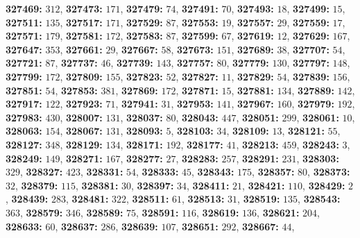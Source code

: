 \textsf{\bfseries 327469:} $312$, \textsf{\bfseries 327473:} $171$, \textsf{\bfseries 327479:} $74$, \textsf{\bfseries 327491:} $70$, \textsf{\bfseries 327493:} $18$, \textsf{\bfseries 327499:} $15$, \textsf{\bfseries 327511:} $135$, \textsf{\bfseries 327517:} $171$, \textsf{\bfseries 327529:} $87$, \textsf{\bfseries 327553:} $19$, \textsf{\bfseries 327557:} $29$, \textsf{\bfseries 327559:} $17$, \textsf{\bfseries 327571:} $179$, \textsf{\bfseries 327581:} $172$, \textsf{\bfseries 327583:} $87$, \textsf{\bfseries 327599:} $67$, \textsf{\bfseries 327619:} $12$, \textsf{\bfseries 327629:} $167$, \textsf{\bfseries 327647:} $353$, \textsf{\bfseries 327661:} $29$, \textsf{\bfseries 327667:} $58$, \textsf{\bfseries 327673:} $151$, \textsf{\bfseries 327689:} $38$, \textsf{\bfseries 327707:} $54$, \textsf{\bfseries 327721:} $87$, \textsf{\bfseries 327737:} $46$, \textsf{\bfseries 327739:} $143$, \textsf{\bfseries 327757:} $80$, \textsf{\bfseries 327779:} $130$, \textsf{\bfseries 327797:} $148$, \textsf{\bfseries 327799:} $172$, \textsf{\bfseries 327809:} $155$, \textsf{\bfseries 327823:} $52$, \textsf{\bfseries 327827:} $11$, \textsf{\bfseries 327829:} $54$, \textsf{\bfseries 327839:} $156$, \textsf{\bfseries 327851:} $54$, \textsf{\bfseries 327853:} $381$, \textsf{\bfseries 327869:} $172$, \textsf{\bfseries 327871:} $15$, \textsf{\bfseries 327881:} $134$, \textsf{\bfseries 327889:} $142$, \textsf{\bfseries 327917:} $122$, \textsf{\bfseries 327923:} $71$, \textsf{\bfseries 327941:} $31$, \textsf{\bfseries 327953:} $141$, \textsf{\bfseries 327967:} $160$, \textsf{\bfseries 327979:} $192$, \textsf{\bfseries 327983:} $430$, \textsf{\bfseries 328007:} $131$, \textsf{\bfseries 328037:} $80$, \textsf{\bfseries 328043:} $447$, \textsf{\bfseries 328051:} $299$, \textsf{\bfseries 328061:} $10$, \textsf{\bfseries 328063:} $154$, \textsf{\bfseries 328067:} $131$, \textsf{\bfseries 328093:} $5$, \textsf{\bfseries 328103:} $34$, \textsf{\bfseries 328109:} $13$, \textsf{\bfseries 328121:} $55$, \textsf{\bfseries 328127:} $348$, \textsf{\bfseries 328129:} $134$, \textsf{\bfseries 328171:} $192$, \textsf{\bfseries 328177:} $41$, \textsf{\bfseries 328213:} $459$, \textsf{\bfseries 328243:} $3$, \textsf{\bfseries 328249:} $149$, \textsf{\bfseries 328271:} $167$, \textsf{\bfseries 328277:} $27$, \textsf{\bfseries 328283:} $257$, \textsf{\bfseries 328291:} $231$, \textsf{\bfseries 328303:} $329$, \textsf{\bfseries 328327:} $423$, \textsf{\bfseries 328331:} $54$, \textsf{\bfseries 328333:} $45$, \textsf{\bfseries 328343:} $175$, \textsf{\bfseries 328357:} $80$, \textsf{\bfseries 328373:} $32$, \textsf{\bfseries 328379:} $115$, \textsf{\bfseries 328381:} $30$, \textsf{\bfseries 328397:} $34$, \textsf{\bfseries 328411:} $21$, \textsf{\bfseries 328421:} $110$, \textsf{\bfseries 328429:} $2$, \textsf{\bfseries 328439:} $283$, \textsf{\bfseries 328481:} $322$, \textsf{\bfseries 328511:} $61$, \textsf{\bfseries 328513:} $31$, \textsf{\bfseries 328519:} $135$, \textsf{\bfseries 328543:} $363$, \textsf{\bfseries 328579:} $346$, \textsf{\bfseries 328589:} $75$, \textsf{\bfseries 328591:} $116$, \textsf{\bfseries 328619:} $136$, \textsf{\bfseries 328621:} $204$, \textsf{\bfseries 328633:} $60$, \textsf{\bfseries 328637:} $286$, \textsf{\bfseries 328639:} $107$, \textsf{\bfseries 328651:} $292$, \textsf{\bfseries 328667:} $44$, 
